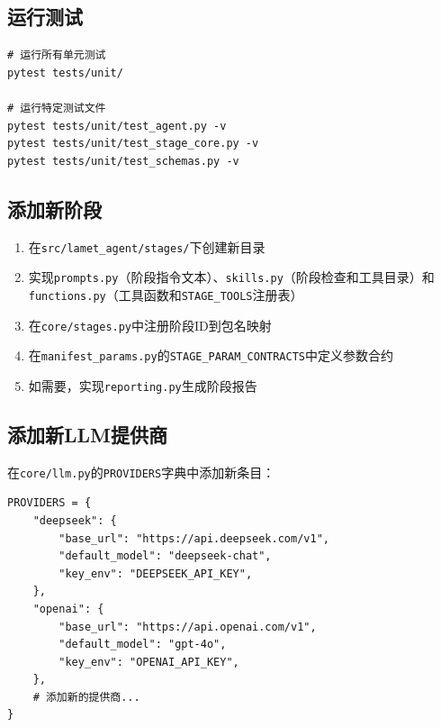 \documentclass[12pt,a4paper]{ctexart}
\begin{document}
\subsection{运行测试}

\begin{lstlisting}[caption={运行测试套件}]
# 运行所有单元测试
pytest tests/unit/

# 运行特定测试文件
pytest tests/unit/test_agent.py -v
pytest tests/unit/test_stage_core.py -v
pytest tests/unit/test_schemas.py -v
\end{lstlisting}

\subsection{添加新阶段}

\begin{enumerate}[leftmargin=*]
    \item 在\texttt{src/lamet\_agent/stages/}下创建新目录
    \item 实现\texttt{prompts.py}（阶段指令文本）、\texttt{skills.py}（阶段检查和工具目录）和\texttt{functions.py}（工具函数和\texttt{STAGE\_TOOLS}注册表）
    \item 在\texttt{core/stages.py}中注册阶段ID到包名映射
    \item 在\texttt{manifest\_params.py}的\texttt{STAGE\_PARAM\_CONTRACTS}中定义参数合约
    \item 如需要，实现\texttt{reporting.py}生成阶段报告
\end{enumerate}

\subsection{添加新LLM提供商}

在\texttt{core/llm.py}的\texttt{PROVIDERS}字典中添加新条目：
\begin{lstlisting}
PROVIDERS = {
    "deepseek": {
        "base_url": "https://api.deepseek.com/v1",
        "default_model": "deepseek-chat",
        "key_env": "DEEPSEEK_API_KEY",
    },
    "openai": {
        "base_url": "https://api.openai.com/v1",
        "default_model": "gpt-4o",
        "key_env": "OPENAI_API_KEY",
    },
    # 添加新的提供商...
}
\end{lstlisting}
\end{document}
